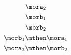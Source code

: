 {\begin{forslides}
\begin{equation}
            \label{eq:f2}
            \mora_2
        \end{equation}
        \begin{equation}
            \label{eq:g1}
            \morb_1
        \end{equation}
        \begin{equation}
            \label{eq:g2}
            \morb_2
        \end{equation}
        \begin{equation}
            \label{eq:g1f1}
            \morb_1\mthen \mora_1
        \end{equation}
        \begin{equation}
            \label{eq:f2g2}
            \mora_2\mthen \morb_2
        \end{equation}
    \end{forslides}
}
